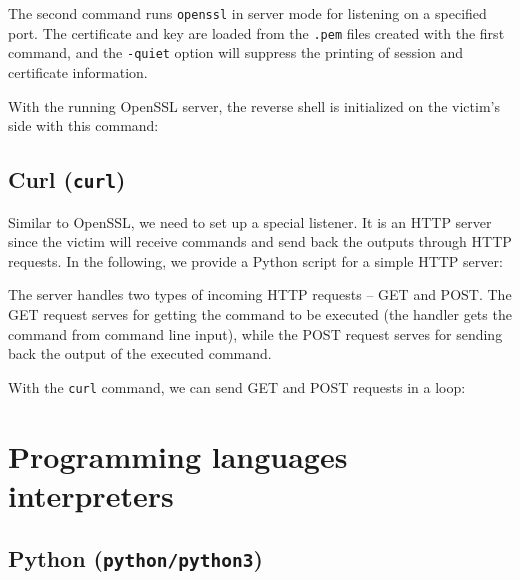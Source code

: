 The second command runs \texttt{openssl} in server mode for listening on a specified port. The certificate and key are loaded from the \texttt{.pem} files created with the first command, and the \texttt{-quiet} option will suppress the printing of session and certificate information. \cite{openssl-doc}

With the running OpenSSL server, the reverse shell is initialized on the victim's side with this command:




\subsection{Curl (\texttt{curl})}


Similar to OpenSSL, we need to set up a special listener. It is an HTTP server since the victim will receive commands and send back the outputs through HTTP requests. In the following, we provide a Python script for a simple HTTP server:


The server handles two types of incoming HTTP requests -- GET and POST. The GET request serves for getting the command to be executed (the handler gets the command from command line input), while the POST request serves for sending back the output of the executed command.

With the \texttt{curl} command, we can send GET and POST requests in a loop:



\section{Programming languages interpreters}

\subsection{Python (\texttt{python/python3})}



